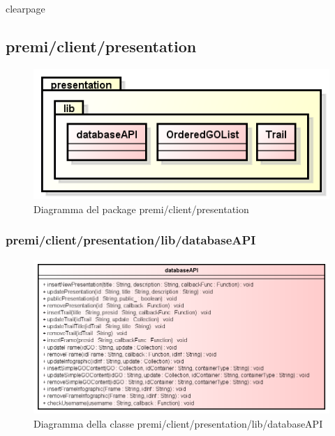 clearpage
\subsection{premi/client/presentation}
\begin{figure}[H]
\begin{center}
\includegraphics[scale=0.90]{img/diapkg/presentation.png}
\caption{Diagramma del package premi/client/presentation}
\end{center}
\end{figure}


\subsubsection{premi/client/presentation/lib/databaseAPI}
\begin{figure}[H]
\begin{center}
\includegraphics[scale=0.55]{img/diacla/databaseAPI.png}
\caption{Diagramma della classe premi/client/presentation/lib/databaseAPI}
\end{center}
\end{figure}


